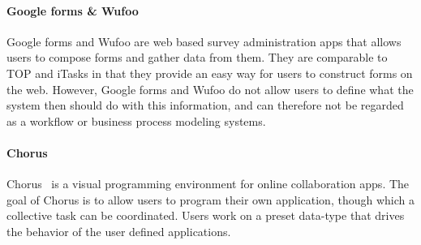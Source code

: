 \paragraph{Google forms \& Wufoo}

Google forms and Wufoo are web based survey administration apps that allows
users to compose forms and gather data from them. They are comparable to TOP and
iTasks in that they provide an easy way for users to construct forms on the web.
However, Google forms and Wufoo do not allow users to define what the system
then should do with this information, and can therefore not be regarded as a
workflow or business process modeling systems.

\paragraph{Chorus} %

Chorus~\cite{chen2017chorus} is a visual programming environment for online
collaboration apps. The goal of Chorus is to allow users to program their own
application, though which a collective task can be coordinated. Users work on a
preset data-type that drives the behavior of the user defined applications.
